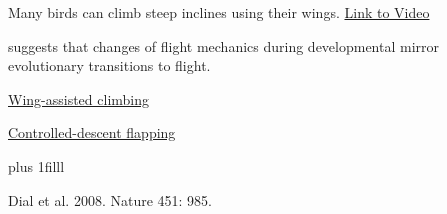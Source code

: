\documentclass[t]{beamer}
\begin{document}
{
\begin{frame}[b,plain]{Many birds can climb steep inclines using their wings.}
	\tiny\hspace{1.1in} \href{https://www.youtube.com/watch?v=Owf2iEwV-gk}{Link to Video}
\end{frame}
}
{
\begin{frame}[t,plain]{ suggests that changes of flight mechanics during developmental mirror evolutionary transitions to flight.}

\vspace{1cm}

\hangpara\hspace{19em}\href{https://www.youtube.com/watch?v=5Rjin-tjOxU}{Wing-assisted climbing}

\hangpara\hspace{19em}\href{https://www.youtube.com/watch?v=FhDQvRBngkQ}{Controlled-descent flapping}

\vskip0pt plus 1filll

\tiny\hfill Dial et al. 2008. Nature 451: 985.
\end{frame}
}
\end{document}
